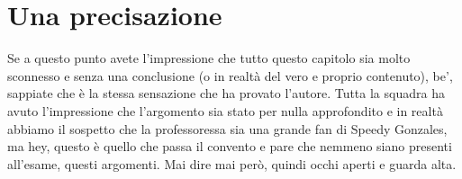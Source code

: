 \documentclass[class=book, crop=false, oneside, 12pt]{standalone}
\begin{document}
\section*{Una precisazione}
Se a questo punto avete l'impressione che tutto questo capitolo sia molto sconnesso e senza una conclusione (o in realtà del vero e proprio contenuto), be', sappiate che è la stessa sensazione che ha provato l'autore. Tutta la squadra ha avuto l'impressione che l'argomento sia stato per nulla approfondito e in realtà abbiamo il sospetto che la professoressa sia una grande fan di Speedy Gonzales, ma hey, questo è quello che passa il convento e pare che nemmeno siano presenti all'esame, questi argomenti. Mai dire mai però, quindi occhi aperti e guarda alta.
\end{document}
